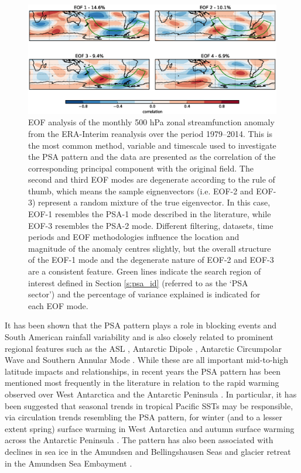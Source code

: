\begin{figure}
\begin{center}
\includegraphics[width=1\columnwidth]{figures/psa/Figure1-2.eps}
\caption[EOF analysis of the monthly 500 hPa zonal streamfunction anomaly]{\label{fig:eof}
EOF analysis of the monthly 500 hPa zonal streamfunction anomaly from the ERA-Interim reanalysis over the period 1979--2014. This is the most common method, variable and timescale used to investigate the PSA pattern and the data are presented as the correlation of the corresponding principal component with the original field. The second and third EOF modes are degenerate according to the \citet{North1982} rule of thumb, which means the sample eignenvectors (i.e. EOF-2 and EOF-3) represent a random mixture of the true eigenvector. In this case, EOF-1 resembles the PSA-1 mode described in the literature, while EOF-3 resembles the PSA-2 mode. Different filtering, datasets, time periods and EOF methodologies influence the location and magnitude of the anomaly centres slightly, but the overall structure of the EOF-1 mode and the degenerate nature of EOF-2 and EOF-3 are a consistent feature. Green lines indicate the search region of interest defined in Section \ref{s:psa_id} (referred to as the `PSA sector') and the percentage of variance explained is indicated for each EOF mode.%
}
\end{center}
\end{figure}

It has been shown that the PSA pattern plays a role in blocking events \citep{Sinclair1997,Renwick1999} and South American rainfall variability \citep{Mo2001} and is also closely related to prominent regional features such as the ASL \citep{Turner2013}, Antarctic Dipole \citep{Yuan2001}, Antarctic Circumpolar Wave \citep{Christoph1998} and Southern Annular Mode \citep[SAM; e.g.][]{Ding2012}. While these are all important mid-to-high latitude impacts and relationships, in recent years the PSA pattern has been mentioned most frequently in the literature in relation to the rapid warming observed over West Antarctica and the Antarctic Peninsula \citep{Nicolas2014}. In particular, it has been suggested that seasonal trends in tropical Pacific SSTs may be responsible, via circulation trends resembling the PSA pattern, for winter (and to a lesser extent spring) surface warming in West Antarctica \citep{Ding2011} and autumn surface warming across the Antarctic Peninsula \citep{Ding2013}. The pattern has also been associated with declines in sea ice in the Amundsen and Bellingshausen Seas \citep{Schneider2012} and glacier retreat in the Amundsen Sea Embayment \citep{Steig2012}.

